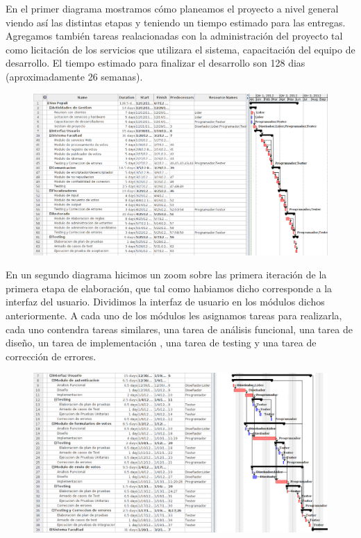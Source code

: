 \par

En el primer diagrama mostramos cómo planeamos el proyecto a nivel general viendo así las distintas etapas y teniendo un tiempo estimado para las entregas. Agregamos tambi\'en tareas realacionadas con la administración del proyecto tal como licitaci\'on de los servicios que utilizara el sistema, capacitación del equipo de desarrollo. El tiempo estimado para
finalizar el desarrollo son 128 dias (aproximadamente 26 semanas).	

\par
\begin{figure}[H]
\includegraphics[scale=0.5]{./imagenes/gantintegral.png}
\end{figure}

\par
En un segundo diagrama hicimos un zoom sobre las primera iteración de la primera etapa de elaboración, que tal como habiamos dicho corresponde a la interfaz del usuario. Dividimos la interfaz de usuario en los m\'odulos dichos anteriormente. A cada uno de los m\'odulos les asignamos tareas para realizarla, cada uno contendra tareas similares, una tarea de an\'alisis funcional, una tarea de diseño, un tarea de implementaci\'on , una tarea de testing y una tarea de correcci\'on de errores.

\par
\begin{figure}[H]
\begin{center}
\includegraphics[scale=0.5]{./imagenes/gantiteracion.png}
\end{center}
\end{figure}


